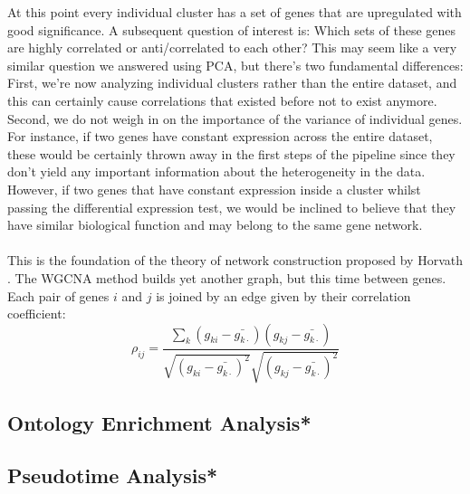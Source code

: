 At this point every individual cluster has a set of genes that are upregulated with good significance. A subsequent question of interest is: Which sets of these genes are highly correlated or anti/correlated to each other? This may seem like a very similar question we answered using PCA, but there's two fundamental differences: First, we're now analyzing individual clusters rather than the entire dataset, and this can certainly cause correlations that existed before not to exist anymore. Second, we do not weigh in on the importance of the variance of individual genes. For instance, if two genes have constant expression across the entire dataset, these would be certainly thrown away in the first steps of the pipeline since they don't yield any important information about the heterogeneity in the data. However, if two genes that have constant expression inside a cluster whilst passing the differential expression test, we would be inclined to believe that they have similar biological function and may belong to the same gene network.\\
\\
This is the foundation of the theory of network construction proposed by Horvath \cite{}. The WGCNA method builds yet another graph, but this time between genes. Each pair of genes $i$ and $j$ is joined by an edge given by their correlation coefficient:
$$
\rho_{ij} = \frac{\sum_{k} (g_{ki} - \bar{g_{k\cdot}})(g_{kj} - \bar{g_{k\cdot}})}{\sqrt{(g_{ki} - \bar{g_{k\cdot}})^2}\sqrt{(g_{kj} - \bar{g_{k\cdot}})^2}}
$$


\subsection{Ontology Enrichment Analysis*}

\subsection{Pseudotime Analysis*}
\newpage



